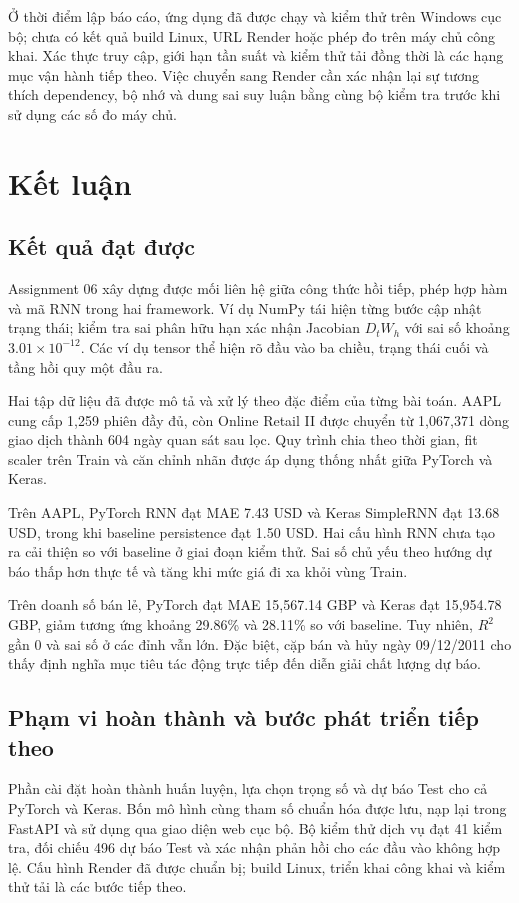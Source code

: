 \documentclass[12pt,a4paper]{report}
\begin{document}
Ở thời điểm lập báo cáo, ứng dụng đã được chạy và kiểm thử trên Windows cục bộ; chưa có kết quả build Linux, URL Render hoặc phép đo trên máy chủ công khai. Xác thực truy cập, giới hạn tần suất và kiểm thử tải đồng thời là các hạng mục vận hành tiếp theo. Việc chuyển sang Render cần xác nhận lại sự tương thích dependency, bộ nhớ và dung sai suy luận bằng cùng bộ kiểm tra trước khi sử dụng các số đo máy chủ.


\chapter{Kết luận}
\label{chap:conclusion}

\section{Kết quả đạt được}
Assignment 06 xây dựng được mối liên hệ giữa công thức hồi tiếp, phép hợp hàm và mã RNN trong hai framework. Ví dụ NumPy tái hiện từng bước cập nhật trạng thái; kiểm tra sai phân hữu hạn xác nhận Jacobian $D_tW_h$ với sai số khoảng $3.01\times10^{-12}$. Các ví dụ tensor thể hiện rõ đầu vào ba chiều, trạng thái cuối và tầng hồi quy một đầu ra.

Hai tập dữ liệu đã được mô tả và xử lý theo đặc điểm của từng bài toán. AAPL cung cấp 1,259 phiên đầy đủ, còn Online Retail II được chuyển từ 1,067,371 dòng giao dịch thành 604 ngày quan sát sau lọc. Quy trình chia theo thời gian, fit scaler trên Train và căn chỉnh nhãn được áp dụng thống nhất giữa PyTorch và Keras.

Trên AAPL, PyTorch RNN đạt MAE 7.43 USD và Keras SimpleRNN đạt 13.68 USD, trong khi baseline persistence đạt 1.50 USD. Hai cấu hình RNN chưa tạo ra cải thiện so với baseline ở giai đoạn kiểm thử. Sai số chủ yếu theo hướng dự báo thấp hơn thực tế và tăng khi mức giá đi xa khỏi vùng Train.

Trên doanh số bán lẻ, PyTorch đạt MAE 15,567.14 GBP và Keras đạt 15,954.78 GBP, giảm tương ứng khoảng 29.86\% và 28.11\% so với baseline. Tuy nhiên, $R^2$ gần 0 và sai số ở các đỉnh vẫn lớn. Đặc biệt, cặp bán và hủy ngày 09/12/2011 cho thấy định nghĩa mục tiêu tác động trực tiếp đến diễn giải chất lượng dự báo.

\section{Phạm vi hoàn thành và bước phát triển tiếp theo}
Phần cài đặt hoàn thành huấn luyện, lựa chọn trọng số và dự báo Test cho cả PyTorch và Keras. Bốn mô hình cùng tham số chuẩn hóa được lưu, nạp lại trong FastAPI và sử dụng qua giao diện web cục bộ. Bộ kiểm thử dịch vụ đạt 41 kiểm tra, đối chiếu 496 dự báo Test và xác nhận phản hồi cho các đầu vào không hợp lệ. Cấu hình Render đã được chuẩn bị; build Linux, triển khai công khai và kiểm thử tải là các bước tiếp theo.
\end{document}
